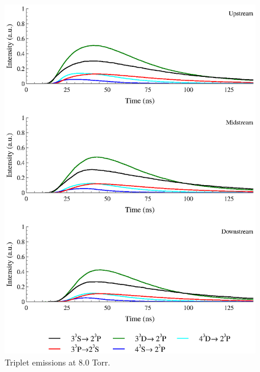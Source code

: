 \begin{figure}
  \centering
  \includegraphics{./chapters/extraem/figures/8torr_t.eps}
  \caption{Triplet emissions at 8.0 Torr.}
\end{figure}

